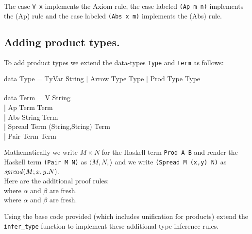 \documentclass[11pt]{article}
\begin{document}
The case {\tt{V x}} implements the Axiom rule, the case labeled {\tt{(Ap m
n)}} implements the (Ap) rule and the case labeled {\tt{(Abs x m)}} implements
the (Abs) rule.


\subsection{Adding product types.}

To add product types  we extend the data-types {\tt{Type}} and {\tt{term}} as follows:

\begin{program*}
\>   data Type = TyVar String | Arrow Type Type | Prod Type Type \\
\> \\
\>  data Term = V String \\
\>            | Ap Term Term \\
\>            | Abs String Term \\
\>            | Spread Term (String,String) Term \\
\>            | Pair Term Term\\
\end{program*}

  Mathematically we write $M\times{}N$ for the Haskell term {\tt{Prod A B}} and
render the Haskell term {\tt{(Pair M N)}} as $\langle{}M,N,\rangle$ and we
write {\tt{(Spread M (x,y) N)}} as ${\mathit{spread}({M};{x,y}.{N})}$.
\ \\
Here are the additional proof rules:
\vspace{.125in}\\

{\hspace{.25in}} where $\alpha$ and $\beta$ are fresh.
\vspace{.125in}\\

{\hspace{.25in}} where $\alpha$ and $\beta$ are fresh.
\vspace{.125in}\\


\begin{exercise}
Using the base code provided (which includes unification for products) extend
the {\tt{infer\_type}} function to implement these additional type inference
rules.
\end{exercise}
\end{document}

